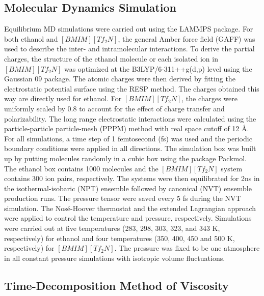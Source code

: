 \documentclass[12pt]{article}
\begin{document}
\subsection{Molecular Dynamics Simulation}

Equilibrium MD simulations were carried out using the LAMMPS package. \cite{lammps}
For both ethanol and $[BMIM][Tf_2N]$,
the general Amber force field (GAFF) \cite{Case.JCC.25.1157.2004}
was used to describe the inter- and intramolecular interactions.
To derive the partial charges,
the structure of the ethanol molecule or each isolated ion in $[BMIM][Tf_2N]$ was optimized at the B3LYP/6-311++g(d,p) level
using the Gaussian 09 package.
\cite{g09}
The atomic charges were then derived by fitting the electrostatic potential surface
using the RESP method.
\cite{RESP}
The charges obtained this way are directly used for ethanol.
For $[BMIM][Tf_2N]$, the charges were uniformly scaled by 0.8 to account for the effect of charge transfer and polarizability.
\cite{Maginn.JPCB.116.10036.2012}
The long range electrostatic interactions were calculated using the particle-particle particle-mesh (PPPM) method\cite{pppm}
with real space cutoff of 12 \AA.
For all simulations,
a time step of 1 femtosecond (fs) was used and the periodic boundary conditions were applied in all directions.
The simulation box was built up by putting molecules randomly in a cubic box using the package Packmol.
\cite{Martinez.JCC.24.819.2003,
Martinez.JCC.30.2157.2009}
The ethanol box contains 1000 molecules and the $[BMIM][Tf_2N]$ system contains 300 ion pairs, respectively.
The systems were then equilibrated for 2ns in the isothermal-isobaric (NPT) ensemble
followed by canonical (NVT) ensemble production runs.
The pressure tensor were saved every 5 fs during the NVT simulation.
The Nos\'e-Hoover thermostat
\cite{Nose-Hoover.PRA.31.1695.1985}
and the extended Lagrangian approach
\cite{Shinoda.PR.B.69.134103}
were applied to control the temperature and pressure, respectively.
Simulations were carried out at five temperatures (283, 298, 303, 323, and 343 K, respectively) for ethanol
and four temperatures (350, 400, 450 and 500 K, respectively) for $[BMIM][Tf_2N]$.
The pressure was fixed to be one atmosphere in all constant pressure simulations
with isotropic volume fluctuations.


\subsection{Time-Decomposition Method of Viscosity}
\end{document}
